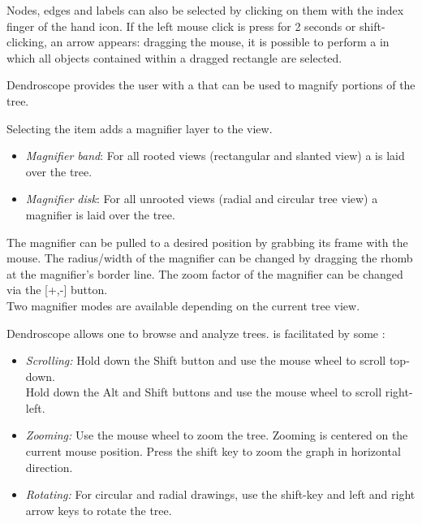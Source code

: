 \documentclass[11pt]{article}
\def\Dendroscope{{\sf Dendroscope }}
\begin{document}



Nodes, edges and labels can also be selected by clicking on them with the index finger of the hand icon.
If the left  mouse click is press for 2 seconds or shift-clicking, an arrow appears:
dragging the mouse, it is possible to perform a   in which all objects contained within a dragged rectangle
are selected.

Dendroscope provides the user with a  that can be used to
magnify portions of the tree.

Selecting the  item adds a magnifier layer to the view.
\begin{itemize}
\item {\em Magnifier band}:
For all rooted views (rectangular and slanted view) a  is laid over the tree. 
\item {\em Magnifier disk}:
For all unrooted views (radial and circular tree view) a  magnifier is 
laid over the tree.
\end{itemize}

The magnifier can be pulled to a desired position by grabbing its frame with the mouse.
The radius/width of the magnifier can be changed by dragging the rhomb at the magnifier's border line.
The zoom factor of the magnifier can be changed via the [+,-] button.\\
Two magnifier modes are available depending on the current tree view.



 \Dendroscope allows one to browse and analyze trees.
 is facilitated by some :
\begin{itemize}
\item {\em Scrolling:} 
Hold down the Shift button and use the mouse wheel to scroll top-down.\\
Hold down the Alt and Shift buttons and use the mouse wheel to scroll right-left.
\item {\em Zooming:} 
Use the mouse wheel to zoom the tree. Zooming is centered on the current mouse position.
Press the shift key to zoom the graph in 
horizontal direction. 
\item {\em Rotating:} 
For circular and radial drawings, use the shift-key and
left and right arrow keys to rotate the tree.
\end{itemize}
\end{document}

